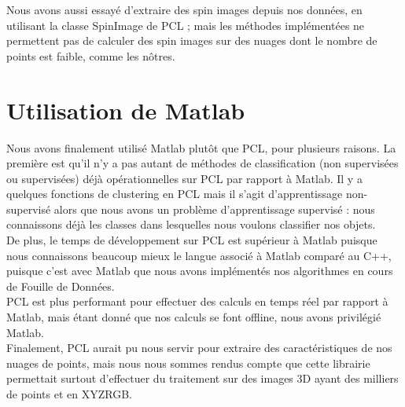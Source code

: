 	Nous avons aussi essayé d'extraire des spin images depuis nos données, en utilisant la classe SpinImage de PCL ; mais les méthodes implémentées ne permettent pas de calculer des spin images sur des nuages dont le nombre de points est faible, comme les nôtres.\\

\section{Utilisation de Matlab}

	Nous avons finalement utilisé Matlab plutôt que PCL, pour plusieurs raisons. La première est qu'il n'y a pas autant de méthodes de classification (non supervisées ou supervisées) déjà opérationnelles sur PCL par rapport à Matlab. Il y a quelques fonctions de clustering en PCL mais il s'agit d'apprentissage non-supervisé alors que nous avons un problème d'apprentissage supervisé : nous connaissons déjà les classes dans lesquelles nous voulons classifier nos objets.\\

	De plus, le temps de développement sur PCL est supérieur à Matlab puisque nous connaissons beaucoup mieux le langue associé à Matlab comparé au C++, puisque c'est avec Matlab que nous avons implémentés nos algorithmes en cours de Fouille de Données. \\

	PCL est plus performant pour effectuer des calculs en temps réel par rapport à Matlab, mais étant donné que nos calculs se font offline, nous avons privilégié Matlab. \\

	Finalement, PCL aurait pu nous servir pour extraire des caractéristiques de nos nuages de points, mais nous nous sommes rendus compte que cette librairie permettait surtout d'effectuer du traitement sur des images 3D ayant des milliers de points et en XYZRGB.\\

